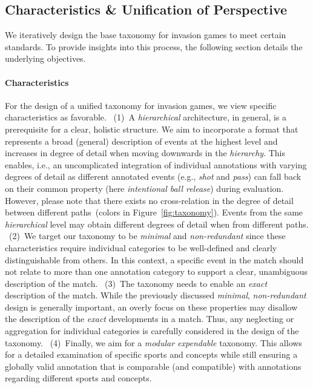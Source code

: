 \subsection{Characteristics \& Unification of Perspective}\label{subsec:characteristics}

We iteratively design the base taxonomy for invasion games to meet certain standards. To provide insights into this process, the following section details the underlying objectives.  

\paragraph{Characteristics}
For the design of a unified taxonomy for invasion games, we view specific characteristics as favorable.
~(1)~A \textit{hierarchical} architecture, in general, is a prerequisite for a clear, holistic structure. We aim to incorporate a format that represents a broad (general) description of events at the highest level and increases in degree of detail when moving downwards in the \textit{hierarchy}. This enables, i.e., an uncomplicated integration of individual annotations with varying degrees of detail as different annotated events (e.g., \textit{shot} and \textit{pass}) can fall back on their common property (here \emph{intentional ball release}) during evaluation.
However, please note that there exists no cross-relation in the degree of detail between different paths~(colors in Figure~\ref{fig:taxonomy}). Events from the same \textit{hierarchical} level may obtain different degrees of detail when from different paths.
~(2)~We target our taxonomy to be \textit{minimal} and \textit{non-redundant} since these characteristics require individual categories to be well-defined and clearly distinguishable from others. In this context, a specific event in the match should not relate to more than one annotation category to support a clear, unambiguous description of the match.
~(3)~The taxonomy needs to enable an \emph{exact} description of the match. While the previously discussed \textit{minimal}, \textit{non-redundant} design is generally important, an overly focus on these properties may disallow the description of the \textit{exact} developments in a match. Thus, any neglecting or aggregation for individual categories is carefully considered in the design of the taxonomy.
~(4)~Finally, we aim for a \textit{modular expendable} taxonomy. This allows for a detailed examination of specific sports and concepts while still ensuring a globally valid annotation that is comparable (and compatible) with annotations regarding different sports and concepts. 

